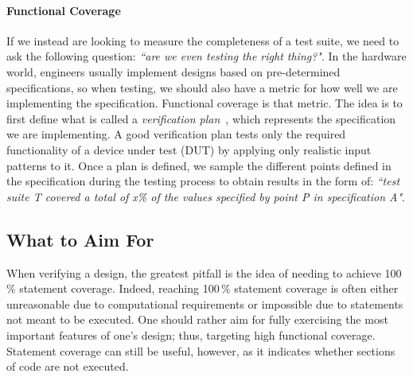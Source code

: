\documentclass[conference]{IEEEtran}
\newcommand{\hjd}[1]{{\color{pink} Hans: #1}}
\begin{document}
%

\paragraph{Functional Coverage} If we instead are looking to measure the completeness of a test suite, we need to ask the following question: \textit{``are we even testing the right thing?"}. 
In the hardware world, engineers usually implement designs based on pre-determined specifications, so when testing, we should also have a metric for how well we are implementing the specification. 
Functional coverage is that metric. 
The idea is to first define what is called a \textit{verification plan}~\cite{spear2008systemverilog}, which represents the specification we are implementing. 
A good verification plan tests only the required functionality of a device under test (DUT) by applying only 
realistic input patterns to it.
Once a plan is defined, we sample the different points defined in the specification during the testing process to obtain results in the form of: \textit{``test suite T covered a total of x\% of the values specified by point P in specification A"}. 

\subsection{What to Aim For}
When verifying a design, the greatest pitfall is the idea of needing to achieve 100\,\% statement coverage. Indeed, reaching 100\,\% statement coverage is often either unreasonable due to computational requirements or impossible due to statements not meant to be executed. One should rather aim for fully exercising the most important features of one's design; thus, targeting high functional coverage. Statement coverage can still be useful, however, as it indicates whether sections of code are not executed. 
\end{document}
